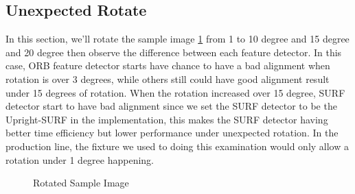 	\subsection{Unexpected Rotate}
		In this section, we'll rotate the sample image \ref{fig:testSamplesOfRotation} from 1 to 10 degree and 15 degree and 20 degree then observe the difference between each feature detector. 
		In this case, ORB feature detector starts have chance to have a bad alignment when rotation is over 3 degrees, while others still could have good alignment result under 15 degrees of rotation. 
		When the rotation increased over 15 degree, SURF detector start to have bad alignment since we set the SURF detector to be the Upright-SURF in the implementation, this makes the SURF detector having better time efficiency but lower performance under unexpected rotation.
		In the production line, the fixture we used to doing this examination would only allow a rotation under 1 degree happening.
		\begin{figure}[H]
			\caption{Rotated Sample Image}
			\label{fig:testSamplesOfRotation}
		\end{figure}

